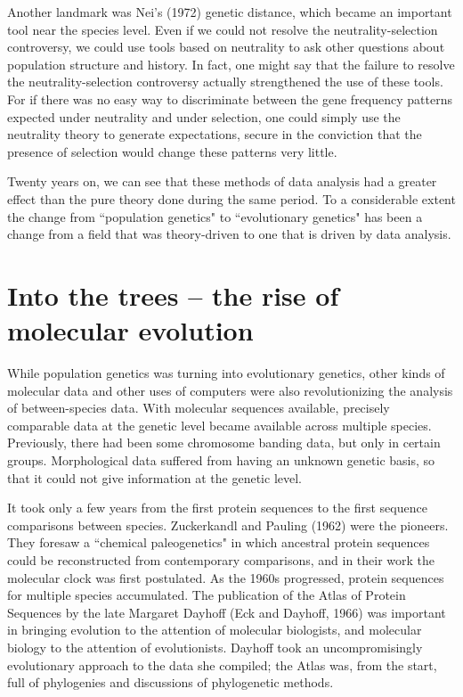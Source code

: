 \documentclass[12pt]{article}
\begin{document}
Another landmark was Nei's (1972) genetic distance, which became an
important tool near the species level.  Even if we could not resolve the
neutrality-selection controversy, we could use tools based on neutrality
to ask other questions about population structure and history.  In fact, one
might say that the failure to resolve the neutrality-selection controversy
actually strengthened the use of these tools.  For if there was no easy way
to discriminate between the gene frequency patterns expected under neutrality
and under selection, one could simply use the neutrality
theory to generate expectations, secure in the conviction that the presence
of selection would change these patterns very little.

Twenty years on, we can see that these methods of data analysis had a greater
effect than the pure theory done during the same period.  To a considerable extent the change from
``population genetics" to ``evolutionary genetics" has been a change from
a field that was theory-driven to one that is driven by data analysis.

\section*{Into the trees -- the rise of molecular evolution}

While population genetics was turning into evolutionary genetics, other kinds of
molecular
data and other uses of computers were also revolutionizing the analysis of
between-species data.  With molecular sequences available, precisely comparable
data at the
genetic level became available across multiple species.  Previously, there had
been some chromosome banding data, but only in certain groups.  Morphological data
suffered from having an unknown genetic basis, so that it could not give
information at the genetic level.

It took only a few years from the first protein sequences to the first
sequence comparisons between species.  Zuckerkandl and Pauling (1962) were
the pioneers.  They foresaw a ``chemical paleogenetics" in which ancestral
protein sequences could be reconstructed from contemporary comparisons, and
in their work the molecular clock was first postulated.  As the 1960s
progressed, protein sequences for multiple species accumulated.  The publication
of the Atlas of Protein Sequences by the late Margaret Dayhoff (Eck and Dayhoff,
1966) was
important in bringing evolution to the attention of molecular biologists, and
molecular biology to the attention of evolutionists.  Dayhoff took an uncompromisingly
evolutionary approach to the data she compiled; the Atlas was, from the start,
full of phylogenies and discussions of phylogenetic methods.
\end{document}
